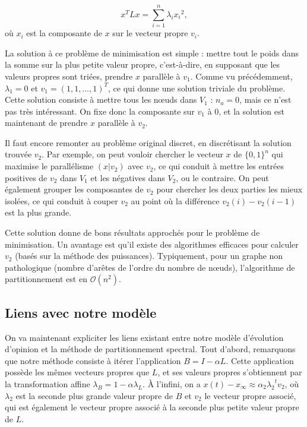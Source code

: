\documentclass[12pt]{article}
\begin{document}
\begin{equation}
 x^T L x = \sum_{i=1}^n \lambda_i {x_i}^2,
\end{equation}
où $x_i$ est la composante de $x$ sur le vecteur propre $v_i$.

La solution à ce problème de minimisation est simple : mettre tout le
poids dans la somme sur la plus petite valeur propre, c'est-à-dire, en
supposant que les valeurs propres sont triées, prendre $x$ parallèle à
$v_1$. Comme vu précédemment, $\lambda_1 = 0$ et $v_1 = (1, 1, \dots,
1)^T$, ce qui donne une solution triviale du problème. Cette solution
consiste à mettre tous les n\oe uds dans $V_1$ : $n_a = 0$, mais ce
n'est pas très intéressant. On fixe donc la composante sur $v_1$ à 0,
et la solution est maintenant de prendre $x$ parallèle à $v_2$.

Il faut encore remonter au problème original discret, en
discrétisant la solution trouvée $v_2$. Par exemple, on peut vouloir
chercher le vecteur $x$ de $\{0,1\}^n$ qui maximise le parallélisme
$(x|v_2)$ avec $v_2$, ce qui conduit à mettre les entrées positives de
$v_2$ dans $V_1$ et les négatives dans $V_2$, ou le contraire. On peut
également grouper les composantes de $v_2$ pour chercher les deux
parties les mieux isolées, ce qui conduit à couper $v_2$ au point où
la différence $v_2(i) - v_2(i-1)$ est la plus grande.

Cette solution donne de bons résultats approchés pour le problème de
minimisation. Un avantage est qu'il existe des algorithmes efficaces
pour calculer $v_2$ (basés sur la méthode des
puissances). Typiquement, pour un graphe non pathologique (nombre
d'arêtes de l'ordre du nombre de n\oe uds), l'algorithme de
partitionnement est en $\mathcal O(n^2)$.

\subsection{Liens avec notre modèle}
On va maintenant expliciter les liens existant entre notre modèle
d'évolution d'opinion et la méthode de partitionnement spectral. Tout
d'abord, remarquons que notre méthode consiste à itérer l'application
$B = I - \alpha L$. Cette application possède les mêmes vecteurs
propres que $L$, et ses valeurs propres s'obtiennent par la
transformation affine $\lambda_B = 1 - \alpha \lambda_L$. À l'infini,
on a $x(t) - x_\infty \approx \alpha_2 {\lambda_2}^t v_2$, où
$\lambda_2$ est la seconde plus grande valeur propre de $B$ et $v_2$
le vecteur propre associé, qui est également le vecteur propre associé
à la seconde plus petite valeur propre de $L$.
\end{document}
